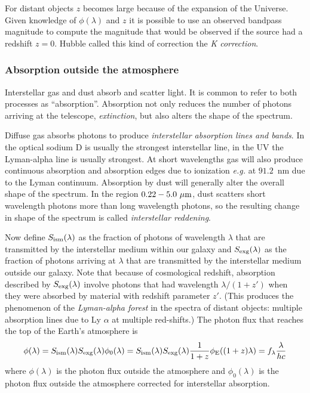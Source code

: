 For distant objects $z$ becomes large because of the expansion of the
Universe. Given knowledge of $\phi(\lambda)$ and $z$ it is possible to
use an observed bandpass magnitude to compute the magnitude that
would be observed if the source had a redshift $z=0$. Hubble called
this kind of correction the {\it K correction}. 
\subsubsection{Absorption outside the atmosphere}
Interstellar gas and dust absorb and scatter light. It is common to
refer to both processes as ``absorption''. Absorption not only reduces
the number of photons arriving at the telescope, {\it extinction}, but
also alters the shape of the spectrum.

Diffuse gas absorbs photons to produce {\it interstellar absorption
  lines and bands}. In the optical sodium D is usually the strongest
interstellar line, in the UV the Lyman-alpha line is usually
strongest. At short wavelengths gas will also produce continuous
absorption and absorption edges due to ionization {\it e.g.} at
$91.2$~nm due to the Lyman continuum. Absorption by dust will
generally alter the overall shape of the spectrum. In the region
$0.22-5.0~\mu{\rm m}$, dust scatters short wavelength photons more
than long wavelength photons, so the resulting change in shape of the
spectrum is called {\it interstellar reddening}. 

Now define $S_{\rm
  ism}(\lambda)$ as the fraction of photons of wavelength $\lambda$
that are transmitted by the interstellar medium within our galaxy and
$S_{\rm exg}(\lambda)$ as the fraction of photons arriving at
$\lambda$ that are transmitted by the interstellar medium outside our
galaxy. Note that because of cosmological redshift, absorption
described by $S_{\rm exg}(\lambda)$ involve photons that had
wavelength ${\lambda/(1+z')}$ when they were absorbed by material with
  redshift parameter $z'$. (This produces the phenomenon of the {\it
    Lyman-alpha forest} in the spectra of distant objects: multiple
  absorption lines due to Ly $\alpha$ at multiple red-shifts.) The
  photon flux that reaches the top of the Earth's atmosphere is 
\[
\phi(\lambda)=S_{\rm ism}(\lambda) S_{\rm
  exg}(\lambda)\phi_0(\lambda)=S_{\rm ism}(\lambda) S_{\rm
  exg}(\lambda)\frac{1}{1+z}\phi_{\rm E}((1+z)\lambda)=f_\lambda\frac{\lambda}{hc}
\]
where $\phi(\lambda)$ is the photon flux outside the atmosphere and
$\phi_0(\lambda)$ is the photon flux outside the atmosphere corrected
for interstellar absorption. 
